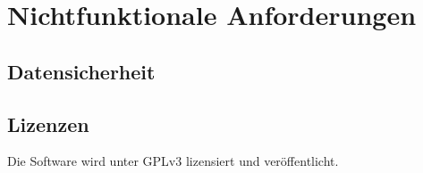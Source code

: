 \documentclass[a4paper,10pt]{article}
\begin{document}
\section{Nichtfunktionale Anforderungen}
\subsection{Datensicherheit}
\subsection{Lizenzen}
Die Software wird unter GPLv3 lizensiert und veröffentlicht.
\end{document}
